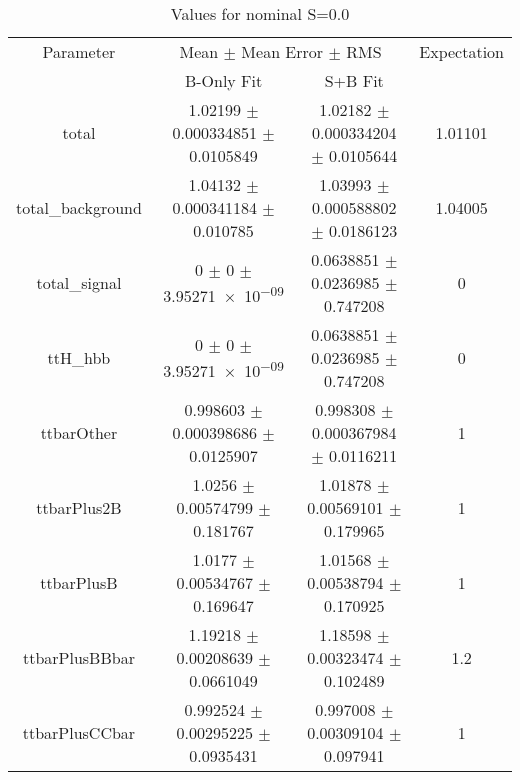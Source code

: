 \begin{table}
\centering
\caption{Values for nominal S=0.0}
\begin{tabular}{cccc}
\toprule
Parameter & \multicolumn{2}{c}{Mean $\pm$ Mean Error $\pm$ RMS} & Expectation\\
 & B-Only Fit & S+B Fit & \\
\midrule
total & \num{1.02199} $\pm$ \num{0.000334851} $\pm$ \num{0.0105849} & \num{1.02182} $\pm$ \num{0.000334204} $\pm$ \num{0.0105644} & \num{1.01101}\\
total\_background & \num{1.04132} $\pm$ \num{0.000341184} $\pm$ \num{0.010785} & \num{1.03993} $\pm$ \num{0.000588802} $\pm$ \num{0.0186123} & \num{1.04005}\\
total\_signal & \num{0} $\pm$ \num{0} $\pm$ \num{3.95271e-09} & \num{0.0638851} $\pm$ \num{0.0236985} $\pm$ \num{0.747208} & \num{0}\\
ttH\_hbb & \num{0} $\pm$ \num{0} $\pm$ \num{3.95271e-09} & \num{0.0638851} $\pm$ \num{0.0236985} $\pm$ \num{0.747208} & \num{0}\\
ttbarOther & \num{0.998603} $\pm$ \num{0.000398686} $\pm$ \num{0.0125907} & \num{0.998308} $\pm$ \num{0.000367984} $\pm$ \num{0.0116211} & \num{1}\\
ttbarPlus2B & \num{1.0256} $\pm$ \num{0.00574799} $\pm$ \num{0.181767} & \num{1.01878} $\pm$ \num{0.00569101} $\pm$ \num{0.179965} & \num{1}\\
ttbarPlusB & \num{1.0177} $\pm$ \num{0.00534767} $\pm$ \num{0.169647} & \num{1.01568} $\pm$ \num{0.00538794} $\pm$ \num{0.170925} & \num{1}\\
ttbarPlusBBbar & \num{1.19218} $\pm$ \num{0.00208639} $\pm$ \num{0.0661049} & \num{1.18598} $\pm$ \num{0.00323474} $\pm$ \num{0.102489} & \num{1.2}\\
ttbarPlusCCbar & \num{0.992524} $\pm$ \num{0.00295225} $\pm$ \num{0.0935431} & \num{0.997008} $\pm$ \num{0.00309104} $\pm$ \num{0.097941} & \num{1}\\
\bottomrule
\end{tabular}
\end{table}
